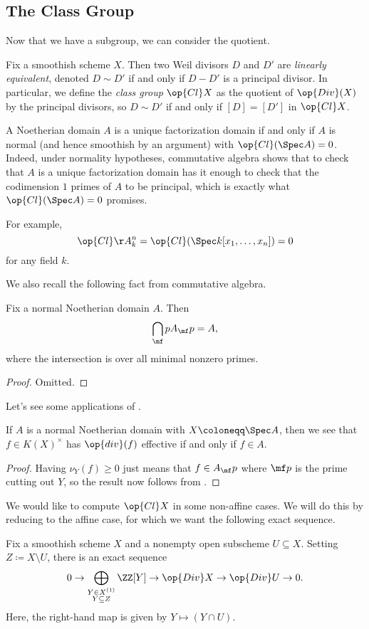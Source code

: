 \documentclass[../notes.tex]{subfiles}
\begin{document}
\subsection{The Class Group}
Now that we have a subgroup, we can consider the quotient.
\begin{definition}
	Fix a smoothish scheme $X$. Then two Weil divisors $D$ and $D'$ are \textit{linearly equivalent}, denoted $D\sim D'$ if and only if $D-D'$ is a principal divisor. In particular, we define the \textit{class group} $\op{Cl}X$ as the quotient of $\op{Div}(X)$ by the principal divisors, so $D\sim D'$ if and only if $[D]=[D']$ in $\op{Cl}X$.
\end{definition}
\begin{example}
	A Noetherian domain $A$ is a unique factorization domain if and only if $A$ is normal (and hence smoothish by an argument) with $\op{Cl}(\Spec A)=0$. Indeed, under normality hypotheses, commutative algebra shows that to check that $A$ is a unique factorization domain has it enough to check that the codimension $1$ primes of $A$ to be principal, which is exactly what $\op{Cl}(\Spec A)=0$ promises.

	For example,
	\[\op{Cl}\AA^n_k=\op{Cl}(\Spec k[x_1,\ldots,x_n])=0\]
	for any field $k$.
\end{example}
We also recall the following fact from commutative algebra.
\begin{proposition} \label{prop:algebraic-hartogs}
	Fix a normal Noetherian domain $A$. Then
	\[\bigcap_\mf pA_\mf p=A,\]
	where the intersection is over all minimal nonzero primes.
\end{proposition}
\begin{proof}
	Omitted.
\end{proof}
Let's see some applications of .
\begin{corollary}
	If $A$ is a normal Noetherian domain with $X\coloneqq\Spec A$, then we see that $f\in K(X)^\times$ has $\op{div}(f)$ effective if and only if $f\in A$.
\end{corollary}
\begin{proof}
	Having $\nu_Y(f)\ge0$ just means that $f\in A_\mf p$ where $\mf p$ is the prime cutting out $Y$, so the result now follows from .
\end{proof}
We would like to compute $\op{Cl}X$ in some non-affine cases. We will do this by reducing to the affine case, for which we want the following exact sequence.
\begin{proposition} \label{prop:div-exact-seq}
	Fix a smoothish scheme $X$ and a nonempty open subscheme $U\subseteq X$. Setting $Z\coloneqq X\setminus U$, there is an exact sequence
	\[0\to\bigoplus_{\substack{Y\in X^{(1)}\\Y\subseteq Z}}\ZZ[Y]\to\op{Div}X\to\op{Div}U\to0.\]
	Here, the right-hand map is given by $Y\mapsto(Y\cap U)$.
\end{proposition}
\end{document}

